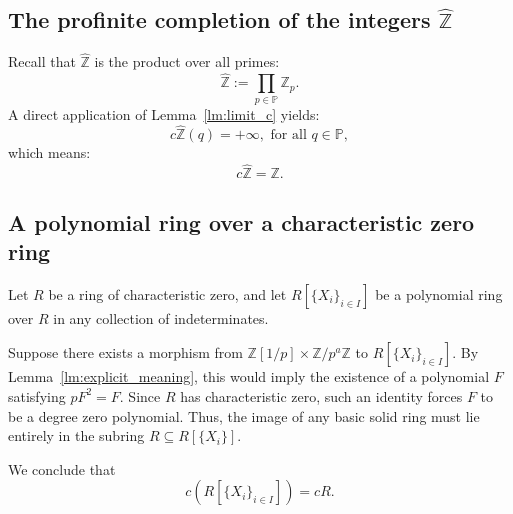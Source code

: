 \documentclass{amsart}
\newcommand{\Z}{{\mathbb Z}}
\renewcommand{\P}{{\mathbb P}}
\begin{document}
    \subsection{The profinite completion of the integers $\widehat{\Z}$}
    Recall that $\widehat{\Z}$ is the product over all primes:
    $$
    \widehat{\Z} := \prod_{p \in \P} \Z_p.
    $$
    A direct application of Lemma~\ref{lm:limit_c} yields:
    $$
    c\widehat{\Z}(q) = 
    +\infty, \text{ for all } q \in \P,
    $$
    which means:
    $$
    c\widehat{\Z} = \Z.
    $$

    \subsection{A polynomial ring over a characteristic zero ring}
    Let $R$ be a ring of characteristic zero, and let $R[\{X_i\}_{i \in I}]$ be a polynomial ring over $R$ in any collection of indeterminates.

    Suppose there exists a morphism from $\Z[1/p] \times \Z/p^a\Z$ to $R[\{X_i\}_{i \in I}]$. By Lemma~\ref{lm:explicit_meaning}, this would imply the existence of a polynomial $F$ satisfying $pF^2 = F$. Since $R$ has characteristic zero, such an identity forces $F$ to be a degree zero polynomial. Thus, the image of any basic solid ring must lie entirely in the subring $R \subseteq R[\{X_i\}]$.
    
    We conclude that
    $$
    c(R[\{X_i\}_{i \in I}]) = cR.
    $$

    
    \printbibliography
\end{document}
